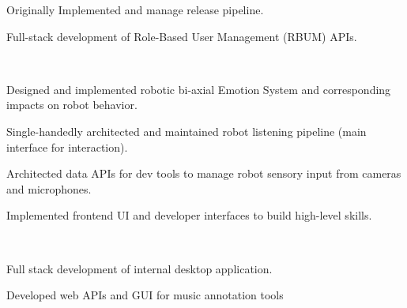 \documentclass[]{csaund_resume-openfont}
\begin{document}
\begin{minipage}[t]{0.66\textwidth}
\begin{tightemize}
\item Originally Implemented and manage release pipeline.
\item Full-stack development of Role-Based User Management (RBUM) APIs.
\end{tightemize}
\sectionsep

 \\
\begin{tightemize}
\item Designed and implemented robotic bi-axial Emotion System and corresponding impacts on robot behavior.
\item Single-handedly architected and maintained robot listening pipeline (main interface for interaction).
\end{tightemize}
\begin{tightemize}
\item Architected data APIs for dev tools to manage robot sensory input from cameras and microphones.
\item Implemented frontend UI and developer interfaces to build high-level skills.
\end{tightemize}
\sectionsep

 \\
\begin{tightemize}
\item Full stack development of internal desktop application.
\item Developed web APIs and GUI for music annotation tools
\end{tightemize}
\sectionsep

\end{minipage}

\pagebreak

\end{document}
